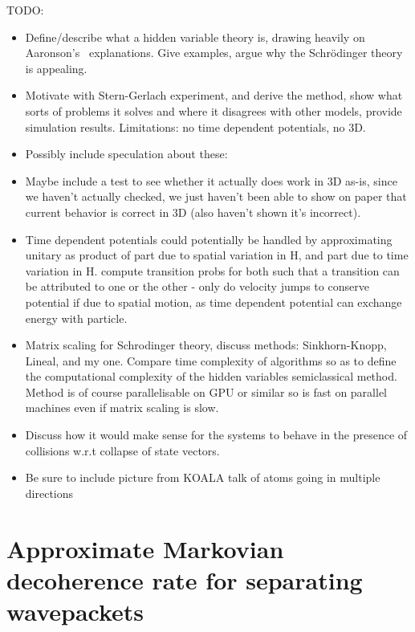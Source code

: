 TODO:
\begin{itemize}
\item Define/describe what a hidden variable theory is, drawing heavily on Aaronson's~\cite{Aaronson2005} explanations. Give examples, argue why the Schr\"odinger theory is appealing.

\item Motivate with Stern-Gerlach experiment, and derive the method, show what sorts of problems it
solves and where it disagrees with other models, provide simulation results. Limitations: no time dependent potentials, no 3D.

\item Possibly include speculation about these:

\item Maybe include a test to see whether it actually does work in 3D as-is, since we haven't actually checked, we just haven't been able to show on paper that current behavior is correct in 3D (also haven't shown it's incorrect).

\item Time dependent potentials could potentially be handled by approximating unitary as product of part due to spatial variation in H, and part due to time variation in H. compute transition probs for both such that a transition can be attributed to one or the other - only do velocity jumps to conserve potential if due to spatial motion, as time dependent potential can exchange energy with particle.

\item Matrix scaling for Schrodinger theory, discuss methods: Sinkhorn-Knopp, Lineal, and my one. Compare time complexity of algorithms so as to define the computational complexity of the hidden variables semiclassical method. Method is of course parallelisable on GPU or similar so is fast on parallel machines even if matrix scaling is slow.

\item Discuss how it would make sense for the systems to behave in the presence of collisions w.r.t collapse of state vectors.

\item Be sure to include picture from KOALA talk of atoms going in multiple directions
\end{itemize}

\section{Approximate Markovian decoherence rate for separating wavepackets}

